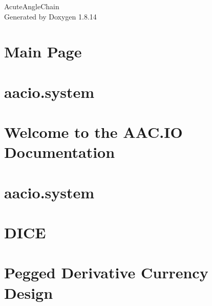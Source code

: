 \documentclass[twoside]{book}
\newcommand{\+}{\discretionary{\mbox{\scriptsize$\hookleftarrow$}}{}{}}
\newcommand{\clearemptydoublepage}{%
  \newpage{\pagestyle{empty}\cleardoublepage}%
}
\begin{document}
\hypersetup{pageanchor=false,
             bookmarksnumbered=true,
             pdfencoding=unicode
            }
\begin{titlepage}
\vspace*{7cm}
\begin{center}%
{\Large Acute\+Angle\+Chain }\\
\vspace*{1cm}
{\large Generated by Doxygen 1.8.14}\\
\end{center}
\end{titlepage}
\clearemptydoublepage
{}
\tableofcontents
\clearemptydoublepage
{}
\hypersetup{pageanchor=true}

\chapter{Main Page}
\label{index}\hypertarget{index}{}
\chapter{aacio.\+system}
\label{md_contracts_aacio_8system__r_e_a_d_m_e}

\chapter{Welcome to the A\+A\+C.\+IO Documentation}
\label{md_contracts_aaciolib_mainpage}

\chapter{aacio.\+system}
\label{md_contracts_bancor__r_e_a_d_m_e}

\chapter{D\+I\+CE}
\label{md_contracts_dice__r_e_a_d_m_e}

\chapter{Pegged Derivative Currency Design}
\label{md_contracts_exchange__pegged__derivative__currency__design}

\end{document}
